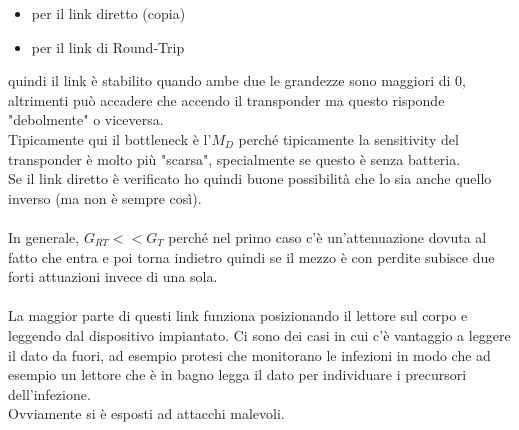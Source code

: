 \documentclass[oneside, 12pt]{extbook}
\begin{document}
\begin{itemize}
	\item per il link diretto (copia)
	\item per il link di Round-Trip
\end{itemize}
quindi il link è stabilito quando ambe due le grandezze sono maggiori di 0, altrimenti può accadere che accendo il transponder ma questo risponde "debolmente" o viceversa.\\Tipicamente qui il bottleneck è l'$M_D$ perché tipicamente la sensitivity del transponder è molto più "scarsa", specialmente se questo è senza batteria.\\Se il link diretto è verificato ho quindi buone possibilità che lo sia anche quello inverso (ma non è sempre così).\\\\In generale, $G_{RT} << G_T$ perché nel primo caso c'è un'attenuazione dovuta al fatto che entra e poi torna indietro quindi se il mezzo è con perdite subisce due forti attuazioni invece di una sola.\\\\La maggior parte di questi link funziona posizionando il lettore sul corpo e leggendo dal dispositivo impiantato. Ci sono dei casi in cui c'è vantaggio a leggere il dato da fuori, ad esempio protesi che monitorano le infezioni in modo che ad esempio un lettore che è in bagno legga il dato per individuare i precursori dell'infezione.\\Ovviamente si è esposti ad attacchi malevoli.
\end{document}
